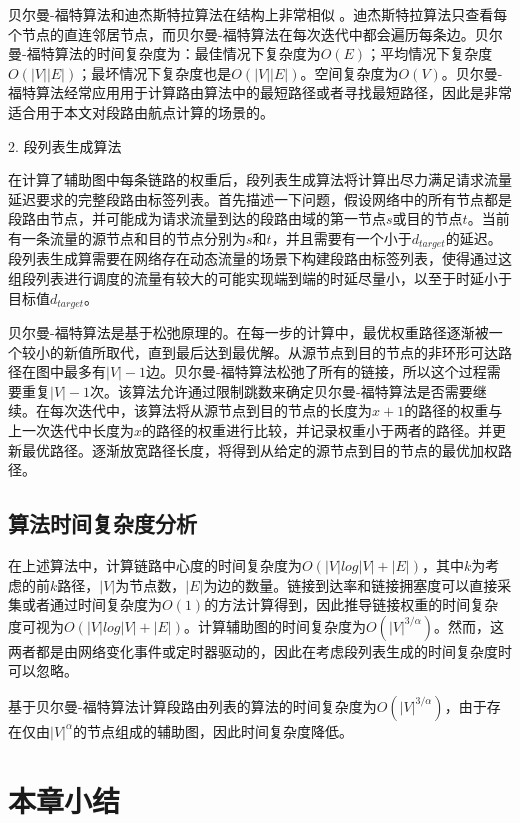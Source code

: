 贝尔曼-福特算法和迪杰斯特拉算法在结构上非常相似 \cite{BFOPTI} 。迪杰斯特拉算法只查看每个节点的直连邻居节点，而贝尔曼-福特算法在每次迭代中都会遍历每条边。贝尔曼-福特算法的时间复杂度为：最佳情况下复杂度为$O(E)$；平均情况下复杂度$O(|V||E|)$；最坏情况下复杂度也是$O(|V||E|)$。空间复杂度为$O(V)$。贝尔曼-福特算法经常应用用于计算路由算法中的最短路径或者寻找最短路径，因此是非常适合用于本文对段路由航点计算的场景的。

2. 段列表生成算法

在计算了辅助图中每条链路的权重后，段列表生成算法将计算出尽力满足请求流量延迟要求的完整段路由标签列表。首先描述一下问题，假设网络中的所有节点都是段路由节点，并可能成为请求流量到达的段路由域的第一节点$s$或目的节点$t$。当前有一条流量的源节点和目的节点分别为$s$和$t$，并且需要有一个小于$d_{target}$的延迟。段列表生成算需要在网络存在动态流量的场景下构建段路由标签列表，使得通过这组段列表进行调度的流量有较大的可能实现端到端的时延尽量小，以至于时延小于目标值$d_{target}$。

贝尔曼-福特算法是基于松弛原理的。在每一步的计算中，最优权重路径逐渐被一个较小的新值所取代，直到最后达到最优解。从源节点到目的节点的非环形可达路径在图中最多有$|V|-1$边。贝尔曼-福特算法松弛了所有的链接，所以这个过程需要重复$|V|-1$次。该算法允许通过限制跳数来确定贝尔曼-福特算法是否需要继续。在每次迭代中，该算法将从源节点到目的节点的长度为$x+1$的路径的权重与上一次迭代中长度为$x$的路径的权重进行比较，并记录权重小于两者的路径。并更新最优路径。逐渐放宽路径长度，将得到从给定的源节点到目的节点的最优加权路径。

\subsection{算法时间复杂度分析}

在上述算法中，计算链路中心度的时间复杂度为$O(|V|log|V|+|E|)$，其中$k$为考虑的前$k$路径，$|V|$为节点数，$|E|$为边的数量。链接到达率和链接拥塞度可以直接采集或者通过时间复杂度为$O(1)$的方法计算得到，因此推导链接权重的时间复杂度可视为$O(|V|log|V|+|E|)$。计算辅助图的时间复杂度为$O({|V|}^{3/\alpha})$。然而，这两者都是由网络变化事件或定时器驱动的，因此在考虑段列表生成的时间复杂度时可以忽略。

基于贝尔曼-福特算法计算段路由列表的算法的时间复杂度为$O({|V|}^{3/\alpha})$，由于存在仅由${|V|}^\alpha$的节点组成的辅助图，因此时间复杂度降低。

\section{本章小结}

